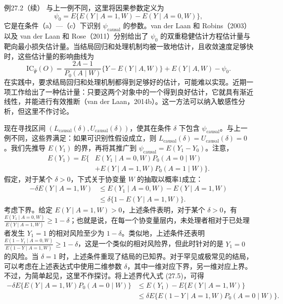 \begin{bookresult}{例}{27.2（续）}
与上一例不同，这里将因果参数定义为
\[
 \psi_0=E\{E(Y\mid A=1,W)-E(Y\mid A=0,W)\},
\]
它是在条件（a）—（c）下识别 $\psi_{\mathrm{causal}}$ 的参数。van der Laan 和 Robins（2003）以及 van der Laan 和 Rose（2011）分别给出了 $\psi_0$ 的双重稳健估计方程估计量与靶向最小损失估计量。当结局回归和处理机制均被一致地估计，且收敛速度足够快时，这些估计量的影响曲线为
\[
 \mathrm{IC}_{\hat\Psi}(O)
 =\frac{2A-1}{P_0(A\mid W)}\{Y-E(Y\mid A,W)\}+E(Y\mid A,W)-\psi_0.
\]
在实践中，要求结局回归和处理机制都得到足够好的估计，可能难以实现。近期一项工作给出了一种估计量：只要这两个对象中的一个得到良好估计，它就具有渐近线性，并能进行有效推断（van der Laan，2014b）。这一方法可以纳入敏感性分析，但这里不作讨论。

现在寻找区间 $(L_{\mathrm{causal}}(\delta),U_{\mathrm{causal}}(\delta))$，使其在条件 $\delta$ 下包含 $\psi_{\mathrm{causal}}$。与上一例不同，这些界满足：如果可识别性假设成立，则 $L_{\mathrm{causal}}(\delta)=U_{\mathrm{causal}}(\delta)=0$。我们先推导 $E(Y_1)$ 的界，再将其推广到 $\psi_{\mathrm{causal}}=E(Y_1-Y_0)$。注意，
\begin{equation}
 \begin{aligned}
 E(Y_1)=E\bigl\{&E(Y_1\mid A=0,W)P_0(A=0\mid W)\\
 &+E(Y\mid A=1,W)P_0(A=1\mid W)\bigr\}.
 \end{aligned}
 \tag{27.5}
\end{equation}
假定，对于某个 $\delta>0$，下式关于协变量 $W$ 的抽取以概率1成立：
\[
 \begin{aligned}
 -\delta E(Y\mid A=1,W)
 &\leq E(Y_1\mid A=0,W)-E(Y\mid A=1,W)\\
 &\leq\delta\{1-E(Y\mid A=1,W)\}.
 \end{aligned}
\]
考虑下界。给定 $E(Y\mid A=1,W)>0$，上述条件表明，对于某个 $\delta>0$，有 $\frac{E(Y_1\mid A=0,W)}{E(Y\mid A=1,W)}\geq1-\delta$；也就是说，在每一个协变量层内，未处理者相对于已处理者发生 $Y_1=1$ 的相对风险至少为 $1-\delta$。类似地，上述条件还表明 $\frac{E(1-Y_1\mid A=0,W)}{E(1-Y\mid A=1,W)}\geq1-\delta$，这是一个类似的相对风险界，但此时针对的是 $Y_1=0$ 的风险。当 $\delta=1$ 时，上述条件重现了结局的已知界。对于罕见或极常见的结局，可以考虑在上述表达式中使用二维参数 $\delta$，其中一维对应下界，另一维对应上界。不过，为简单起见，这里不作探讨。将上述界代入式 (27.5)，可得
\begin{equation}
 \begin{aligned}
 -\delta E\{E(Y\mid A=1,W)P_0(A=0\mid W)\}
 &\leq E(Y_1)-E\{E(Y\mid A=1,W)\}\\
 &\leq\delta E\{E(1-Y\mid A=1,W)P_0(A=0\mid W)\}.
 \end{aligned}
 \tag{27.6}
\end{equation}


\end{bookresult}
